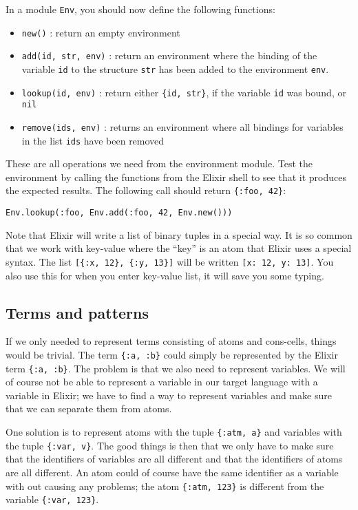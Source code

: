 \documentclass[a4paper,11pt]{article}
\begin{document}
In a module {\tt Env}, you should now define the following functions:

\begin{itemize}
\item {\tt new()} : return an empty environment

\item {\tt add(id, str, env)} : return an environment where the
  binding of the variable {\tt id} to the structure {\tt str} has been
  added to the environment {\tt env}.

\item {\tt lookup(id, env)} : return either {\tt \{id, str\}}, if the
  variable {\tt id} was bound, or {\tt nil}

\item {\tt remove(ids, env)} : returns an environment where all
  bindings for variables in the list {\tt ids} have been removed
\end{itemize}

These are all operations we need from the environment module. Test the
environment by calling the functions from the Elixir shell to see that
it produces the expected results. The following
call should return {\tt \{:foo,  42\}}:

\begin{verbatim}
Env.lookup(:foo, Env.add(:foo, 42, Env.new()))
\end{verbatim}

Note that Elixir will write a list of binary tuples in a special
way. It is so common that we work with key-value where the ``key'' is
an atom that Elixir uses a special syntax. The list {\tt [\{:x, 12\},
  \{:y, 13\}]} will be written {\tt [x: 12, y: 13]}. You also use this
for when you enter key-value list, it will save you some typing.

\subsection{Terms and patterns}

If we only needed to represent terms consisting of atoms and
cons-cells, things would be trivial. The term {\tt \{:a, :b\}} could
simply be represented by the Elixir term {\tt \{:a, :b\}}. The problem
is that we also need to represent variables. We will of
course not be able to represent a variable in our target language with
a variable in Elixir; we have to find a way to represent variables and
make sure that we can separate them from atoms.

One solution is to represent atoms with the tuple {\tt \{:atm, a\}} and
variables with the tuple {\tt \{:var, v\}}. The good things is then
that we only have to make sure that the identifiers of variables are
all different and that the identifiers of atoms are all different. An
atom could of course have the same identifier as a variable with out
causing any problems; the atom {\tt \{:atm, 123\}} is different from
the variable {\tt \{:var, 123\}}.
\end{document}
